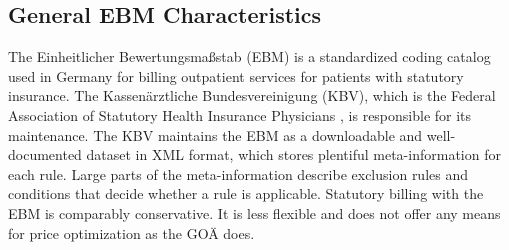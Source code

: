 \subsection{General EBM Characteristics}\label{subsec:general-ebm-characteristics}
The Einheitlicher Bewertungsmaßstab (EBM) is a standardized coding catalog used in Germany for billing outpatient services for patients with statutory insurance.
The Kassenärztliche Bundesvereinigung (KBV), which is the Federal Association of Statutory Health Insurance Physicians \cite[]{hermanns2015ebm}, is responsible for its maintenance.
The KBV maintains the EBM as a downloadable and well-documented dataset in XML format, which stores plentiful meta-information for each rule.
Large parts of the meta-information describe exclusion rules and conditions that decide whether a rule is applicable.
Statutory billing with the EBM is comparably conservative.
It is less flexible and does not offer any means for price optimization as the GOÄ does.



